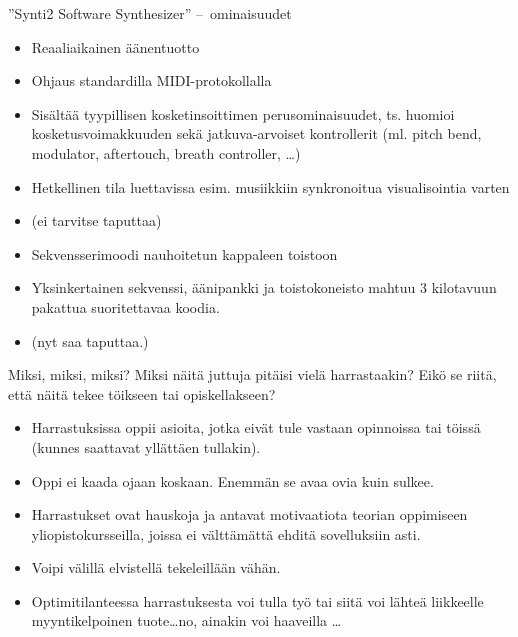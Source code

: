 \documentclass[pdf,9pt,handout]{beamer}
\begin{document}
\begin{frame}{''Synti2 Software Synthesizer'' --~ominaisuudet}
  \begin{itemize}
  \item Reaaliaikainen äänentuotto 
  \item Ohjaus standardilla MIDI-protokollalla
  \item Sisältää tyypillisen kosketinsoittimen perusominaisuudet,
    ts. huomioi kosketusvoimakkuuden sekä jatkuva-arvoiset
    kontrollerit (ml. pitch bend, modulator, aftertouch, breath
    controller, \ldots)
  \item Hetkellinen tila luettavissa esim. musiikkiin synkronoitua
    visualisointia varten
  \item[] (ei tarvitse taputtaa)
  \item Sekvensserimoodi nauhoitetun kappaleen toistoon
  \item Yksinkertainen sekvenssi, äänipankki ja toistokoneisto mahtuu
    3 kilotavuun pakattua suoritettavaa koodia.
  \item[] (nyt saa taputtaa.)
  \end{itemize}
\end{frame}

\begin{frame}{Miksi, miksi, miksi?}
  Miksi näitä juttuja pitäisi vielä harrastaakin? Eikö se riitä, että
  näitä tekee töikseen tai opiskellakseen?
  \begin{itemize}
    \item Harrastuksissa oppii asioita, jotka eivät tule vastaan
      opinnoissa tai töissä (kunnes saattavat yllättäen tullakin).
    \item Oppi ei kaada ojaan koskaan. Enemmän se avaa ovia kuin
      sulkee.
    \item Harrastukset ovat hauskoja ja antavat motivaatiota teorian
      oppimiseen yliopistokursseilla, joissa ei välttämättä ehditä
      sovelluksiin asti.
    \item Voipi välillä elvistellä tekeleillään vähän.
    \item Optimitilanteessa harrastuksesta voi tulla työ tai siitä voi
      lähteä liikkeelle myyntikelpoinen tuote\ldots no, ainakin voi
      haaveilla \ldots
  \end{itemize}
\end{frame}
\end{document}
